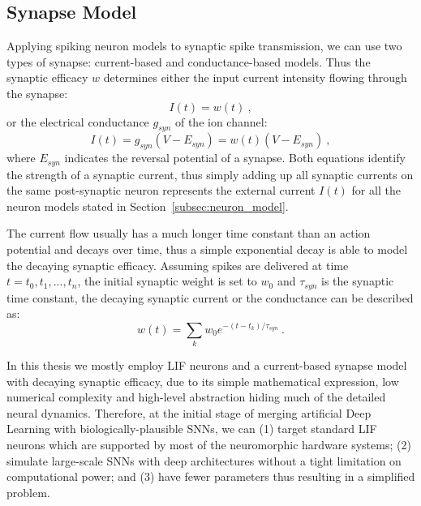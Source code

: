 \subsection{Synapse Model}
Applying spiking neuron models to synaptic spike transmission, we can use two types of synapse: current-based and conductance-based models.
Thus the synaptic efficacy $w$ determines either the input current intensity flowing through the synapse: %
\begin{equation}
I(t) = w(t)~,
\end{equation}
or the electrical conductance $g_{syn}$ of the ion channel: %
\begin{equation}
I(t) = g_{syn} (V-E_{syn}) = w(t) (V-E_{syn})~,
\end{equation}
where $E_{syn}$ indicates the reversal potential of a synapse.
Both equations identify the strength of a synaptic current, thus simply adding up all synaptic currents on the same post-synaptic neuron represents the external current $I(t)$ for all the neuron models stated in Section~\ref{subsec:neuron_model}.

The current flow usually has a much longer time constant than an action potential and decays over time, thus a simple exponential decay is able to model the decaying synaptic efficacy.
Assuming spikes are delivered at time $t={t_0, t_1, ..., t_n}$, the initial synaptic weight is set to $w_0$ and $\tau_{syn}$ is the synaptic time constant, the decaying synaptic current or the conductance can be described as:
\begin{equation}
w(t) = \sum_k w_0 e^{-(t-t_k)/\tau_{syn}}~.
\end{equation}

In this thesis we mostly employ LIF neurons and a current-based synapse model with decaying synaptic efficacy, due to its simple mathematical expression, low numerical complexity and high-level abstraction hiding much of the detailed neural dynamics.
Therefore, at the initial stage of merging artificial Deep Learning with biologically-plausible SNNs, we can (1) target standard LIF neurons which are supported by most of the neuromorphic hardware systems; (2) simulate large-scale SNNs with deep architectures without a tight limitation on computational power; and (3) have fewer parameters thus resulting in a simplified problem.


